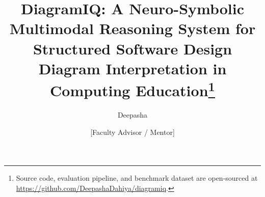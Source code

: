\documentclass[runningheads]{llncs}
\begin{document}
\title{DiagramIQ: A Neuro-Symbolic Multimodal Reasoning System for Structured Software Design Diagram Interpretation in Computing Education\thanks{Source code, evaluation pipeline, and benchmark dataset are open-sourced at \url{https://github.com/DeepashaDahiya/diagramiq}.}}

\author{Deepasha \and
[Faculty Advisor / Mentor]}



\maketitle
\end{document}
